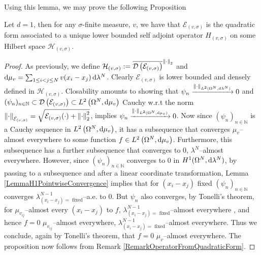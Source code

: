 Using this lemma, we may prove the following Proposition
\begin{proposition}\label{Lemma1dPotentialAllowed}
	Let $ d=1 $, then for any $ \sigma $-finite measure, $ v $, we have that $ \mathcal{E}_{(v,\sigma)} $ is the quadratic form associated to a unique lower bounded self adjoint operator $ H_{(v,\sigma)} $ on some Hilbert space $ \mathcal{H}_{(v,\sigma)} $.
\end{proposition}
\begin{proof}
	As previously, we define $\mathcal{H}_{(v,\sigma)}:=\overline{\mathcal D\left(\mathcal{E}_{(v,\sigma)}\right)}^{\left\lVert \cdot \right\rVert_2} $ and \\
	$ \mathop{}\!\mathrm{d}\mu_v=\sum_{1\leq i<j\leq N}v(x_i-x_j)\mathop{}\!\mathrm{d}\lambda^N $. Clearly $ \mathcal{E}_{(v,\sigma)} $ is lower bounded and densely defined in $ \mathcal{H}_{(v,\sigma)} $. Closability amounts to showing that $ \psi_n\xrightarrow{\left\lVert \cdot \right\rVert_{L^2(\Omega^N,\mathop{}\!\mathrm{d}\lambda^{N})}}0 $ and $ (\psi_n)_{n\in\mathbb{N}}\subset \mathcal D\left(\mathcal{E}_{(v,\sigma)}\right)\subset L^2\left(\Omega^N,\mathop{}\!\mathrm{d}\mu_v\right) $ Cauchy w.r.t the norm $ \left\lVert \cdot \right\rVert_{\mathcal{E}_{(v,\sigma)}}=\sqrt{\mathcal{E}_{(v,\sigma)}(\cdot)+\left\lVert \cdot \right\rVert_2^2} $, implies $ \psi_n\xrightarrow{\left\lVert \cdot \right\rVert_{L^2(\Omega^N,\mathop{}\!\mathrm{d}\mu_v)}}0  $. Now since $ (\psi_n)_{n\in\mathbb{N}}$ is a Cauchy sequence in $ L^2\left(\Omega^N,\mathop{}\!\mathrm{d}\mu_v\right) $, it has a subsequence that converges $ \mu_v $--almost everywhere to some function $ f\in L^2\left(\Omega^N,\mathop{}\!\mathrm{d}\mu_v\right)  $. Furthermore, this subsequence has a further subsequence that converges to $ 0 $, $ \lambda^{N} $--almost everywhere. However, since $ (\psi_n)_{n\in\mathbb{N}}$ converges to $ 0 $ in $ H^1(\Omega^N,\mathop{}\!\mathrm{d} \lambda^N) $, by passing to a subsequence and after a linear coordinate transformation, Lemma \ref{LemmaH1PointwiseConvergence} implies that for $ (x_i-x_j) $ fixed $ (\psi_n)_{n\in\mathbb{N}} $ converges $ \lambda^{N-1}_{(x_i-x_j)=\text{ fixed}} $--a.e. to $ 0 $. 
	But $ \psi_n $ also converges, by Tonelli's theorem, for $ \mu_{v_{ij}} $--almost every $ (x_i-x_j) $ to $ f$,  $ \lambda^{N-1}_{(x_i-x_j)=\text{ fixed}} $--almost everywhere , and hence $ f=0 $ $ \mu_{v_{ij}} $--almost everywhere, $ \lambda^{N-1}_{(x_i-x_j)=\text{ fixed}} $--almost everywhere. Thus we conclude, again by Tonelli's theorem, that $ f=0 $ $ \mu_v $--almost everywhere. The proposition now follows from Remark \ref{RemarkOperatorFromQuadraticForm}.
\end{proof}

